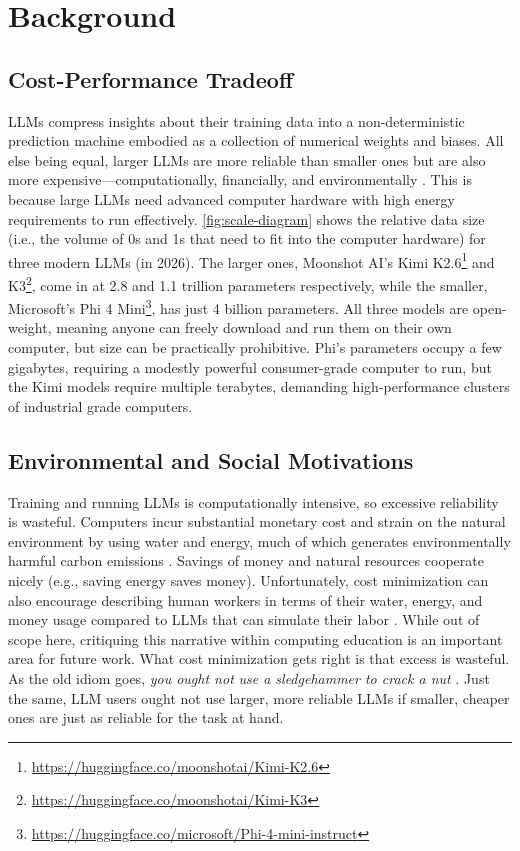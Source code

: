 \section{Background}\label{background}

\subsection{Cost-Performance Tradeoff}\label{cost-performance-tradeoff}

LLMs compress insights about their training data into a non-deterministic prediction machine embodied as a collection of numerical weights and biases. All else being equal, larger LLMs are more reliable than smaller ones but are also more expensive---computationally, financially, and environmentally \cite{dingHybridLlmCostefficient2024,renReconcilingContrastingNarratives2024}. This is because large LLMs need advanced computer hardware with high energy requirements to run effectively. \autoref{fig:scale-diagram} shows the relative data size (i.e., the volume of 0s and 1s that need to fit into the computer hardware) for three modern LLMs (in 2026). The larger ones, Moonshot AI's Kimi K2.6\footnote{\url{https://huggingface.co/moonshotai/Kimi-K2.6}} and K3\footnote{\url{https://huggingface.co/moonshotai/Kimi-K3}}, come in at 2.8 and 1.1 trillion parameters respectively, while the smaller, Microsoft's Phi 4 Mini\footnote{\url{https://huggingface.co/microsoft/Phi-4-mini-instruct}}, has just 4 billion parameters. All three models are open-weight, meaning anyone can freely download and run them on their own computer, but size can be practically prohibitive. Phi's parameters occupy a few gigabytes, requiring a modestly powerful consumer-grade computer to run, but the Kimi models require multiple terabytes, demanding high-performance clusters of industrial grade computers.

\subsection{Environmental and Social Motivations}\label{environmental-and-social-motivations}

Training and running LLMs is computationally intensive, so excessive reliability is wasteful. Computers incur substantial monetary cost and strain on the natural environment by using water and energy, much of which generates environmentally harmful carbon emissions \cite{dingHybridLlmCostefficient2024,renReconcilingContrastingNarratives2024,ModelRoutingAI}. Savings of money and natural resources cooperate nicely (e.g., saving energy saves money). Unfortunately, cost minimization can also encourage describing human workers in terms of their water, energy, and money usage compared to LLMs that can simulate their labor \cite{renReconcilingContrastingNarratives2024}. While out of scope here, critiquing this narrative within computing education is an important area for future work. What cost minimization gets right is that excess is wasteful. As the old idiom goes, \emph{you ought not} \emph{use a sledgehammer to crack a nut} \cite{judsonSagesHeroesAmerican1851}. Just the same, LLM users ought not use larger, more reliable LLMs if smaller, cheaper ones are just as reliable for the task at hand.

